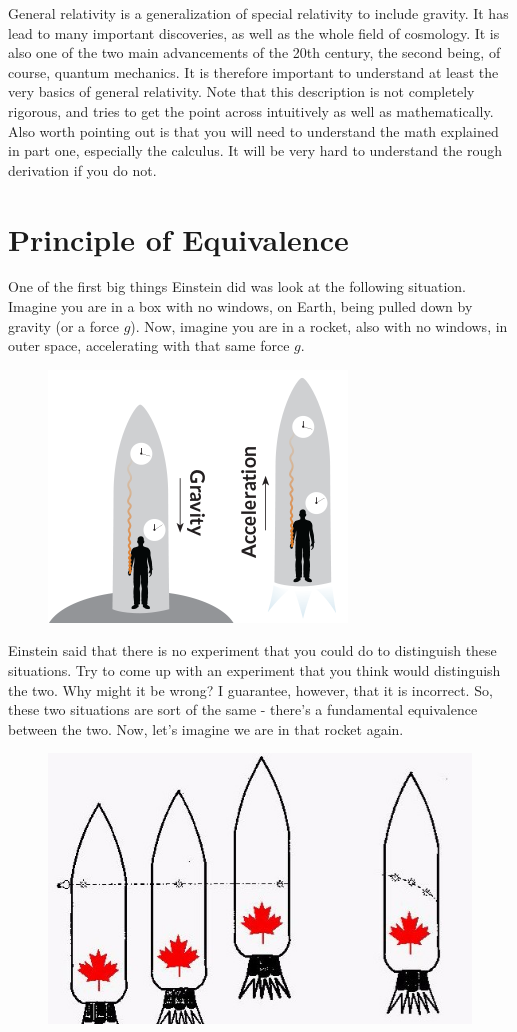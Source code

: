 General relativity is a generalization of special relativity to include gravity. It has lead to many important discoveries,
as well as the whole field of cosmology. It is also one of the two main advancements of the 20th century, the second being, of course,
quantum mechanics. It is therefore important to understand at least the very basics of general relativity.
Note that this description is not completely rigorous, and tries to get the point across intuitively as well as mathematically.
Also worth pointing out is that you will need to understand the math explained in part one, especially the calculus. It will be very
hard to understand the rough derivation if you do not.
\section{Principle of Equivalence}
One of the first big things Einstein did was look at the following situation. Imagine you are in a box with no windows, on Earth, being pulled down
by gravity (or a force $g$). Now, imagine you are in a rocket, also with no windows, in outer space, accelerating with that same force $g$. 
\begin{figure}[H]
\includegraphics[scale=0.5]{equiv.png}
\end{figure}
Einstein said that there is no experiment that you could do to distinguish these situations. Try to come up with an experiment that you
think would distinguish the two. Why might it be wrong? I guarantee, however, that it is incorrect. 
So, these two situations are sort of the same - there's a fundamental equivalence between the two.
Now, let's imagine we are in that rocket again.
\begin{figure}[H]
\includegraphics[scale=0.5]{relgen3.jpg}
\end{figure}
